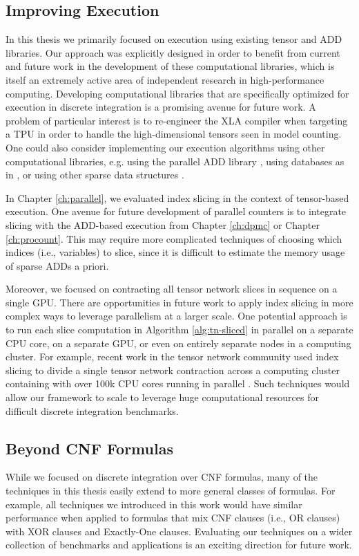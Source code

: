 \subsection{Improving Execution}
In this thesis we primarily focused on execution using existing tensor and ADD libraries.
Our approach was explicitly designed in order to benefit from current and future work in the development of these computational libraries, which is itself an extremely active area of independent research in high-performance computing.
Developing computational libraries that are specifically optimized for execution in discrete integration is a promising avenue for future work.
A problem of particular interest is to re-engineer the XLA compiler when targeting a TPU in order to handle the high-dimensional tensors seen in model counting.
One could also consider implementing our execution algorithms using other computational libraries, e.g. using the parallel ADD library \sylvan{} \cite{van2015sylvan}, using databases as in \cite{fichte2020exploiting}, or using other sparse data structures \cite{sanner2005affine,li2018hicoo}. %

In Chapter \ref{ch:parallel}, we evaluated index slicing in the context of tensor-based execution.
One avenue for future development of parallel counters is to integrate slicing with the ADD-based execution from Chapter \ref{ch:dpmc} or Chapter \ref{ch:procount}.
This may require more complicated techniques of choosing which indices (i.e., variables) to slice, since it is difficult to estimate the memory usage of sparse ADDs a priori.

Moreover, we focused on contracting all tensor network slices in sequence on a single GPU.
There are opportunities in future work to apply index slicing in more complex ways to leverage parallelism at a larger scale. 
One potential approach is to run each slice computation in Algorithm \ref{alg:tn-sliced} in parallel on a separate CPU core, on a separate GPU, or even on entirely separate nodes in a computing cluster.
For example, recent work in the tensor network community used index slicing to divide a single tensor network contraction across a computing cluster containing with over 100k CPU cores running in parallel \cite{CZHNS18}.
Such techniques would allow our framework to scale to leverage huge computational resources for difficult discrete integration benchmarks.


\subsection{Beyond CNF Formulas}
While we focused on discrete integration over CNF formulas, many of the techniques in this thesis easily extend to more general classes of formulas.
For example, all techniques we introduced in this work would have similar performance when applied to formulas that mix CNF clauses (i.e., OR clauses) with XOR clauses and Exactly-One clauses. %
Evaluating our techniques on a wider collection of benchmarks and applications is an exciting direction for future work.

